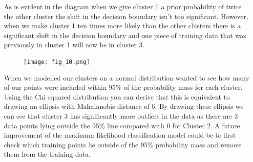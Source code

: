\documentclass[A4Page,11pt]{article}
\begin{document}
As is evident in the diagram when we give cluster 1 a prior probability of twice the other cluster the shift in the decision boundary isn’t too significant. However, when we make cluster 1 ten times more likely than the other clusters there is a significant shift in the decision boundary and one piece of training data that was previously in cluster 1 will now be in cluster 3.

\begin{figure}[h!]
\centering
\texttt{[image: fig\_10.png]}
\caption{\label{fig 1:}}
\end{figure}

When we modelled our clusters on a normal distribution wanted to see how many of our points were included within 95\% of the probability mass for each cluster. Using the Chi squared distribution you can derive that this is equivalent to drawing an ellipsis with Mahalanobis distance of 6. By drawing these ellipsis we can see that cluster 3 has significantly more outliers in the data as there are 3 data points lying outside the 95\% line compared with 0 for Cluster 2.  A future improvement of the maximum likelihood classification model could be to first check which training points lie outside of the 95\% probability mass and remove them from the training data. 






% 
% 
\end{document}
